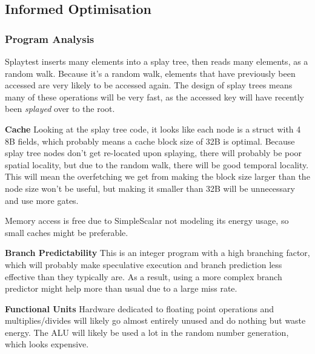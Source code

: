 \documentclass{article}
\begin{document}
\begin{multicols}{2}



  \subsection{Informed Optimisation}
  \subsubsection{Program Analysis}
  Splaytest inserts many elements into a splay tree, then reads many elements, as a random walk. Because it's a random walk, elements that have previously been accessed are very likely to be accessed again. The design of splay trees means many of these operations will be very fast, as the accessed key will have recently been \textit{splayed} over to the root.

  \textbf{Cache} Looking at the splay tree code, it looks like each node is a struct with 4 8B fields, which probably means a cache block size of 32B is optimal. Because splay tree nodes don't get re-located upon splaying, there will probably be poor spatial locality, but due to the random walk, there will be good temporal locality. This will mean the overfetching we get from making the block size larger than the node size won't be useful, but making it smaller than 32B will be unnecessary and use more gates.

  Memory access is free due to SimpleScalar not modeling its energy usage, so small caches might be preferable.

  \textbf{Branch Predictability} This is an integer program with a high branching factor, which will probably make speculative execution and branch prediction less effective than they typically are. As a result, using a more complex branch predictor might help more than usual due to a large miss rate.

  \textbf{Functional Units} Hardware dedicated to floating point operations and multiplies/divides will likely go almost entirely unused and do nothing but waste energy. The ALU will likely be used a lot in the random number generation, which looks expensive.


\end{multicols}
\end{document}
